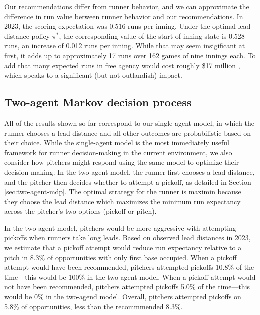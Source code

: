\documentclass{article}
\begin{document}
      Our recommendations differ from runner behavior, and we can approximate the difference in run value between runner behavior and our recommendations. In 2023, the scoring expectation was 0.516 runs per inning. Under the optimal lead distance policy $\pi^*$, the corresponding value of the start-of-inning state is 0.528 runs, an increase of 0.012 runs per inning. While that may seem insigificant at first, it adds up to approximately 17 runs over 162 games of nine innings each. To add that many expected runs in free agency would cost roughly \$17 million \parencite{clemens_what_2021}, which speaks to a significant (but not outlandish) impact.

    \subsection{Two-agent Markov decision process}

      All of the results shown so far correspond to our single-agent model, in which the runner chooses a lead distance and all other outcomes are probabilistic based on their choice. While the single-agent model is the most immediately useful framework for runner decision-making in the current environment, we also consider how pitchers might respond using the same model to optimize their decision-making. In the two-agent model, the runner first chooses a lead distance, and the pitcher then decides whether to attempt a pickoff, as detailed in Section \ref{sec:two-agent-mdp}. The optimal strategy for the runner is maximin because they choose the lead distance which maximizes the minimum run expectancy across the pitcher's two options (pickoff or pitch).

      In the two-agent model, pitchers would be more aggressive with attempting pickoffs when runners take long leads. Based on observed lead distances in 2023, we estimate that a pickoff attempt would reduce run expectancy relative to a pitch in 8.3\% of opportunities with only first base occupied. When a pickoff attempt would have been recommended, pitchers attempted pickoffs 10.8\% of the time---this would be 100\% in the two-agent model. When a pickoff attempt would not have been recommended, pitchers attempted pickoffs 5.0\% of the time---this would be 0\% in the two-agend model. Overall, pitchers attempted pickoffs on 5.8\% of opportunities, less than the recommmended 8.3\%.
\end{document}
